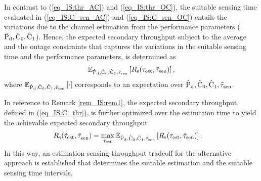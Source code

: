 \begin{coro} \label{cor_IS:cor1}
\normalfont
{} 
In contrast to (\ref{eq_IS:thr_AC}) and (\ref{eq_IS:thr_OC}), the suitable sensing time evaluated in (\ref{eq_IS:C_sen_AC}) and (\ref{eq_IS:C_sen_OC}) entails the variations due to the channel estimation from the performance parameters ($\hat{\text{P}}_{\text{d}}, \hat{\text{C}}_{\text{0}}, \hat{\text{C}}_{\text{1}}$). Hence, the expected secondary throughput subject to the average and the outage constraints that captures the variations in the suitable sensing time and the performance parameters, is determined as 
\begin{align}
{\mathbb E}_{\hat{\text{P}}_{\text{d}}, \hat{\text{C}}_{\text{0}}, \hat{\text{C}}_{\text{1}}, \tilde{\tau}_{\text{sen}}}\left[ R_{\text{s}}(\tau_{\text{est}}, \tilde{\tau}_{\text{sen}}) \right] \label{eq_IS:C_thr},
\end{align}
where ${\mathbb E}_{\hat{\text{P}}_{\text{d}}, \hat{\text{C}}_{\text{0}}, \hat{\text{C}}_{\text{1}}, \tilde{\tau}_{\text{sen}}}\left[ \cdot \right]$ corresponds to an expectation over $\hat{\text{P}}_{\text{d}}, \hat{\text{C}}_{\text{0}}, \hat{\text{C}}_{\text{1}}, \tilde{\tau}_{\text{sen}}$.

In reference to Remark \ref{rem_IS:rem1}, the expected secondary throughput, defined in (\ref{eq_IS:C_thr}), is further optimized over the estimation time to yield the achievable expected secondary throughput 
\begin{align}
R_{\text{s}}(\tilde{\tau}_{\text{est}}, \tilde{\tau}_{\text{sen}}^{\text{}}) &= \operatorname*{max}_{\tau_{\text{est}}} {\mathbb E}_{\hat{\text{P}}_{\text{d}}, \hat{\text{C}}_{\text{0}}, \hat{\text{C}}_{\text{1}}, \tilde{\tau}_{\text{sen}}}\left[ R_{\text{s}}(\tau_{\text{est}}, \tilde{\tau}_{\text{sen}}) \right] \label{eq_IS:C_thr_AC}. 
\end{align}
In this way, an estimation-sensing-throughput tradeoff for the alternative approach is established that determines the suitable estimation and the suitable sensing time intervals.    
\end{coro}
